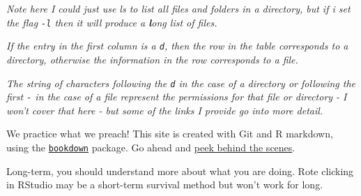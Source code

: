 \documentclass[
]{book}
\begin{document}
\emph{Note here I could just use ls to list all files and folders in a directory, but if i set the flag \texttt{-l} then it will produce a \textbf{l}ong list of files.}

\emph{If the entry in the first column is a \texttt{d}, then the row in the table corresponds to a directory, otherwise the information in the row corresponds to a file.}

\emph{The string of characters following the \texttt{d} in the case of a directory or following the first \texttt{-} in the case of a file represent the permissions for that file or directory - I won't cover that here - but some of the links I provide go into more detail.}

We practice what we preach! This site is created with Git and R markdown, using the \href{https://github.com/rstudio/bookdown/}{\texttt{bookdown}} package. Go ahead and \href{https://github.com/jennybc/happy-git-with-r}{peek behind the scenes}.

Long-term, you should understand more about what you are doing. Rote clicking in RStudio may be a short-term survival method but won't work for long.
\end{document}
